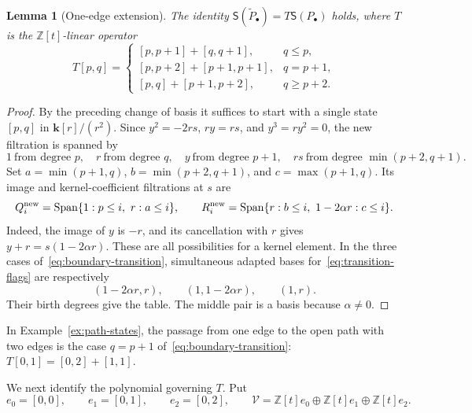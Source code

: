 \documentclass[reqno]{article}
\theoremstyle{plain} %
\newtheorem{lemma}[theorem]{Lemma}
\theoremstyle{definition}
\theoremstyle{remark}
\DeclareMathOperator{\Span}{Span}
\newcommand{\Z}{{\mathbb{Z}}}
\newcommand{\K} {\mathbf{k}}
\numberwithin{equation}{section}
\begin{document}
\begin{lemma}[One-edge extension]
\label{lem:boundary-transition}
The identity $\mathsf S(\widetilde P_\bullet)=T\mathsf S(P_\bullet)$
holds, where $T$ is the $\Z[t]$-linear operator
\begin{equation}
\label{eq:boundary-transition}
T[p,q]=
\begin{cases}
[p,p+1]+[q,q+1],&q\le p,\\
[p,p+2]+[p+1,p+1],&q=p+1,\\
[p,q]+[p+1,p+2],&q\ge p+2.
\end{cases}
\end{equation}
\end{lemma}

\begin{proof}
By the preceding change of basis it suffices to start with a single
state \([p,q]\) in \(\K[r]/(r^2)\). Since
\(y^2=-2rs\), \(ry=rs\), and \(y^3=ry^2=0\), the new filtration is
spanned by
\[
1\ \text{from degree }p,\quad r\ \text{from degree }q,\quad
 y\ \text{from degree }p+1,\quad
rs\ \text{from degree }\min(p+2,q+1).
\]
Set
\(a=\min(p+1,q)\), \(b=\min(p+2,q+1)\), and
\(c=\max(p+1,q)\). Its image and kernel-coefficient filtrations at
\(s\) are
\begin{equation}
\label{eq:transition-flags}
Q_i^{\rm new}=\Span\{1:p\le i,\ r:a\le i\},\qquad
R_i^{\rm new}=\Span\{r:b\le i,\ 1-2\alpha r:c\le i\}.
\end{equation}
Indeed, the image of \(y\) is \(-r\), and its cancellation with
\(r\) gives \(y+r=s(1-2\alpha r)\). These are all possibilities
for a kernel element. In the three cases of~\eqref{eq:boundary-transition},
simultaneous adapted bases for~\eqref{eq:transition-flags} are respectively
\[
(1-2\alpha r,r),\qquad (1,1-2\alpha r),\qquad (1,r).
\]
Their birth degrees give the table. The middle pair is a basis because
\(\alpha\ne0\).
\end{proof}

In Example~\ref{ex:path-states}, the passage from one edge to the open
path with two edges is the case $q=p+1$ of~\eqref{eq:boundary-transition}:
$T[0,1]=[0,2]+[1,1]$.

We next identify the polynomial governing $T$.
Put
\[
e_0=[0,0],\qquad e_1=[0,1],\qquad e_2=[0,2],\qquad
\mathcal V=\Z[t]e_0\oplus\Z[t]e_1\oplus\Z[t]e_2.
\]
\end{document}
